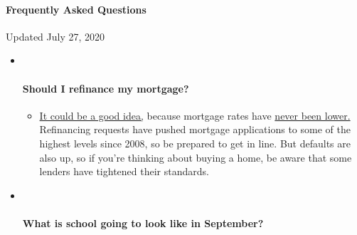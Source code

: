 \hypertarget{frequently-asked-questions}{%
\paragraph{Frequently Asked
Questions}\label{frequently-asked-questions}}

Updated July 27, 2020

\begin{itemize}
\item ~
  \hypertarget{should-i-refinance-my-mortgage}{%
  \paragraph{Should I refinance my
  mortgage?}\label{should-i-refinance-my-mortgage}}

  \begin{itemize}
  \tightlist
  \item
    \href{https://www.nytimes3xbfgragh.onion/article/coronavirus-money-unemployment.html?action=click\&pgtype=Article\&state=default\&region=MAIN_CONTENT_3\&context=storylines_faq}{It
    could be a good idea,} because mortgage rates have
    \href{https://www.nytimes3xbfgragh.onion/2020/07/16/business/mortgage-rates-below-3-percent.html?action=click\&pgtype=Article\&state=default\&region=MAIN_CONTENT_3\&context=storylines_faq}{never
    been lower.} Refinancing requests have pushed mortgage applications
    to some of the highest levels since 2008, so be prepared to get in
    line. But defaults are also up, so if you're thinking about buying a
    home, be aware that some lenders have tightened their standards.
  \end{itemize}
\item ~
  \hypertarget{what-is-school-going-to-look-like-in-september}{%
  \paragraph{What is school going to look like in
  September?}\label{what-is-school-going-to-look-like-in-september}}


\end{itemize}

